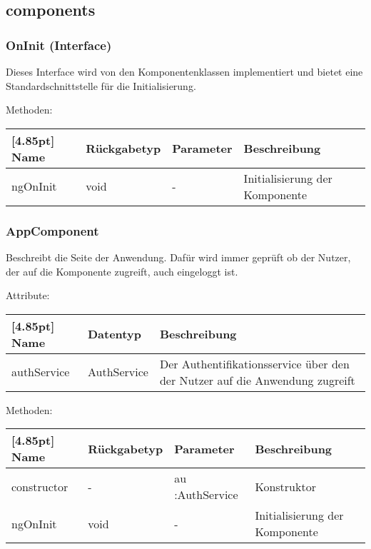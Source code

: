 		\subsection{components}
		
			\subsubsection{OnInit (Interface)}
			
			Dieses Interface wird von den Komponentenklassen implementiert und bietet eine Standardschnittstelle für die Initialisierung.\newline
			
			Methoden:
			\begin{center}
			\setlength\tabcolsep{5pt}
				\renewcommand{\arraystretch}{1.5}
					\begin{tabularx}{\textwidth}{|l|l|l|X|}
					\hline
					\rowcolor[gray]{0.75}[4.85pt]
					Name & Rückgabetyp & Parameter & Beschreibung \\ \hline 
					ngOnInit & void & - & Initialisierung der Komponente \\ \hline
					\end{tabularx}
			\end{center}
		
			\subsubsection{AppComponent}
			
			Beschreibt die Seite der Anwendung. Dafür wird immer geprüft ob der Nutzer, der auf die Komponente zugreift, auch eingeloggt ist.\newline
			
				Attribute:
				\begin{center}
					\renewcommand{\arraystretch}{1.5}
					\setlength\tabcolsep{5pt}
					\begin{tabularx}{\textwidth}{|l|l|X|}
						\hline
						\rowcolor[gray]{0.75}[4.85pt]					
						Name & Datentyp & Beschreibung \\ \hline
						authService & AuthService & Der Authentifikationsservice über den der Nutzer auf die Anwendung zugreift \\ \hline
					\end{tabularx}
				\end{center}
				
				Methoden:
				\begin{center}
				\setlength\tabcolsep{5pt}
					\renewcommand{\arraystretch}{1.5}
						\begin{tabularx}{\textwidth}{|l|l|l|X|}
						\hline
						\rowcolor[gray]{0.75}[4.85pt]
						Name & Rückgabetyp & Parameter & Beschreibung \\ \hline 
						constructor & - & au :AuthService & Konstruktor \\ \hline
						ngOnInit & void & - & Initialisierung der Komponente \\ \hline
						\end{tabularx}
				\end{center}

